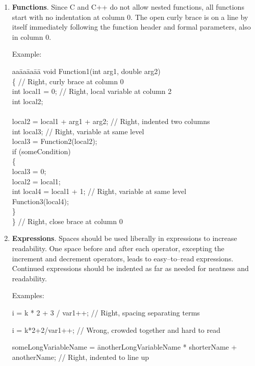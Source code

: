 \documentclass[11pt]{article}
\begin{document}
\begin{enumerate}
\item {\bf Functions}.  Since C and C++ do not allow nested functions,
all functions start with no indentation at column 0.  The open curly
brace is on a line by itself immediately following the function header
and formal parameters, also in column 0.  

Example:

\begin{tt}
\begin{tabbing}
aa\=aa\=aa\=aa\= \kill
void Function1(int arg1, double arg2)\\
\{               // Right, curly brace at column 0\\
\>int local1 = 0;  // Right, local variable at column 2\\
\>int local2;\\
\>\\
\>local2 = local1 + arg1 + arg2;   // Right, indented two columns\\
\>int local3;                      // Right, variable at same level\\
\>local3 = Function2(local2);\\
\>if (someCondition)\\
\>\>\{\\
\>\>\>local3 = 0;\\
\>\>\>local2 = local1;\\
\>\>\>int local4 = local1 + 1;     // Right, variable at same level\\
\>\>\>Function3(local4);\\
\>\>\}\\
\}               // Right, close brace at column 0
\end{tabbing}
\end{tt}

\item {\bf Expressions}.  Spaces should be used liberally in expressions
to increase readability.  One space before and after each operator,
excepting the increment and decrement operators, leads to easy--to--read
expressions.  Continued expressions should be indented as far as needed
for neatness and readability.

Examples:

\begin{tt}
i = k * 2 + 3 / var1++;  // Right, spacing separating terms \\
\end{tt}

\begin{tt}
i = k*2+2/var1++;        // Wrong, crowded together and hard to read
\end{tt}

\begin{tt}
\begin{tabbing}
someLongVariableName = \=anotherLongVariableName * shorterName + \\
\>anotherName;  // Right, indented to line up
\end{tabbing}
\end{tt}

\end{enumerate}
\end{document}
